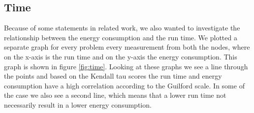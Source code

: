\subsection{Time}
Because of some statements in related work, we also wanted to investigate the relationship between the energy consumption and the run time. We plotted a separate graph for every problem every measurement from both the nodes, where on the x-axis is the run time and on the y-axis the energy consumption. This graph is shown in figure \ref{fig:time}. Looking at these graphs we see a line through the points and based on the Kendall tau scores the run time and energy consumption have a high correlation according to the Guilford scale. In some of the case we also see a second line, which means that a lower run time not necessarily result in a lower energy consumption. 


